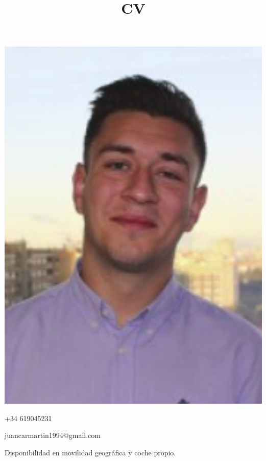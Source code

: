 \documentclass[paper=a4,fontsize=10pt]{temp} %
\begin{document}
\begin{minipage}{.2\linewidth}
   \includegraphics[width=1\textwidth]{juancar}
\end{minipage}      
\begin{minipage}{0.7\linewidth}
   \title{CV}
   \sepspace
   \noindent
   \hfill  +34 619045231

     \hfill juancarmartin1994@gmail.com  
 
   
   \hfill Disponibilidad en movilidad geográfica y coche propio.
   

\end{minipage}

\noindent
\end{document}
